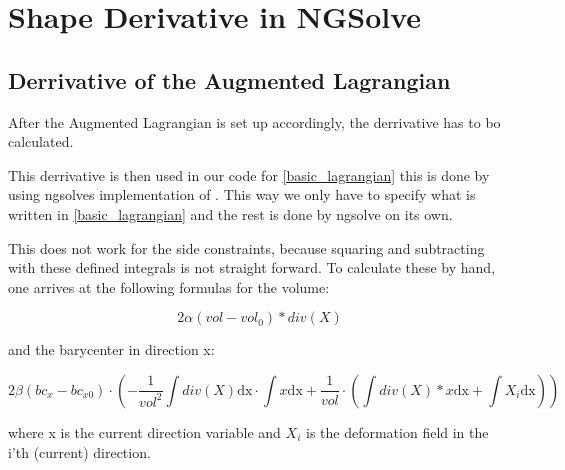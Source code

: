 
\section{Shape Derivative in NGSolve}

\subsection{Derrivative of the Augmented Lagrangian}

After the Augmented Lagrangian is set up accordingly, the derrivative has to bo calculated. 

This derrivative is then used in our code for \ref{basic_lagrangian} this is done by using ngsolves implementation of . 
This way we only have to specify what is written in \ref{basic_lagrangian} and the rest is done by ngsolve on its own.

This does not work for the side constraints, because squaring and subtracting with these defined integrals is not straight forward.
To calculate these by hand, one arrives at the following formulas for the volume:

\begin{equation}\label{eq:constraints_vol}
	2\alpha (vol-vol_0)*div(X)
\end{equation}

and the barycenter in direction x:

\begin{equation}\label{eq:constraints_bc}
	2\beta (bc_x-bc_{x0})\cdot\left(-\frac{1}{vol^2}\int div(X)\mathrm{dx} \cdot \int x \mathrm{dx} + \frac{1}{vol} \cdot (\int div(X)*x \mathrm{dx} + \int X_i\mathrm{dx})\right)
\end{equation}

where x is the current direction variable and $X_i$ is the deformation field in the i'th (current) direction.